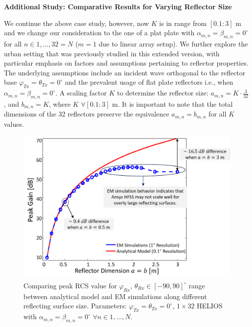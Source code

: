 \textbf{Additional Study: Comparative Results for Varying Reflector Size}

We continue the above case study, however, now $K$ is in range from $[0.1:3]$ \si{\meter} and we change our consideration to the one of a plat plate with $\alpha_{m,n}=\beta_{m,n}=0^\circ$ for all $n \in 1, \dots, 32 = N$ ($m=1$ due to linear array setup). We further explore the urban setting that was previously studied in this extended version, with particular emphasis on factors and assumptions pertaining to reflector properties. The underlying assumptions include an incident wave orthogonal to the reflector base  $\varphi_{Tx}=\theta_{Tx}=0^\circ$ and the prevalent usage of flat plate reflectors i.e., when $\alpha_{m,n}=\beta_{m,n}=0^\circ$. A scaling factor $K$ to determine the reflector size: $a_{m,n} = K \cdot \frac{3}{32}$, and $b_{m,n} = K$, where $K$ $ \forall [0.1:3]$ \si{\meter}. It is important to note that the total dimensions of the \num{32} reflectors preserve the equivalence $a_{m,n}=b_{m,n}$ for all $K$ values.
\begin{figure}[H]
	\centering
	\includegraphics[width=0.8\linewidth]{images/Section 4 Images/casestudy_size}
	\caption{Comparing peak RCS value for $\varphi_{Rx}$, $\theta_{Rx} \in [-90, 90]^\circ$ range between analytical model and EM simulations along different reflecting surface size. Parameters: $\varphi_{Tx}=\theta_{Tx}=0^\circ$, $1 \times 32$ HELIOS with  $\alpha_{m,n}=\beta_{m,n}=0^\circ$ $\forall n \in 1, \dots, N$.}
	\label{fig:casestudy_size}
\end{figure}
